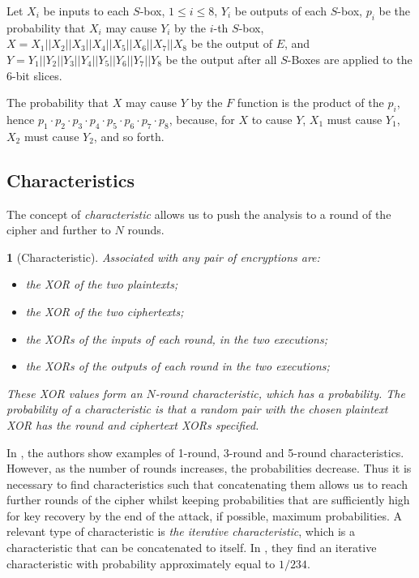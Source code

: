 \documentclass{report}
\newtheorem*{concept}{}{\bfseries}{\itshape}
\begin{document}
Let $X_i$ be inputs to each $S$-box, $1 \leq i \leq 8$, $Y_i$ be outputs of each $S$-box, $p_i$ be the probability that $X_i$ may cause $Y_i$ by the $i$-th $S$-box, $X = X_1||X_2||X_3||X_4||X_5||X_6||X_7||X_8$ be the output of $E$, and $Y = Y_1||Y_2||Y_3||Y_4||Y_5||Y_6||Y_7||Y_8$ be the output after all $S$-Boxes are applied to the $6$-bit slices.

The probability that $X$ may cause $Y$ by the $F$ function is the product of the $p_i$, hence $p_1\cdot p_2\cdot p_3\cdot p_4\cdot p_5\cdot p_6\cdot p_7\cdot p_8$, because, for $X$ to cause $Y$, $X_1$ must cause $Y_1$, $X_2$ must cause $Y_2$, and so forth.

\subsection{Characteristics}

The concept of \emph{characteristic} allows us to push the analysis to a round of the cipher and further to $N$ rounds.

\begin{concept}[Characteristic]
Associated with any pair of encryptions are: 

\begin{itemize}
\item the XOR of the two plaintexts;

\item the XOR of the two ciphertexts;

\item the XORs of the inputs of each round, in the two executions;

\item the XORs of the outputs of each round in the two executions;
\end{itemize}

These XOR values form an \emph{$N$-round characteristic}, which has a probability. The probability of a characteristic is that a random pair with the chosen plaintext XOR has the round and ciphertext XORs specified.
\end{concept}

In \cite{Shamir}, the authors show examples of 1-round, 3-round and 5-round characteristics. However, as the number of rounds increases, the probabilities decrease. Thus it is necessary to find characteristics such that concatenating them allows us to reach further rounds of the cipher whilst keeping probabilities that are sufficiently high for key recovery by the end of the attack, if possible, maximum probabilities. A relevant type of characteristic is \emph{the iterative characteristic}, which is a characteristic that can be concatenated to itself. In \cite{Shamir}, they find an iterative characteristic with probability approximately equal to $1/234$.
\end{document}
